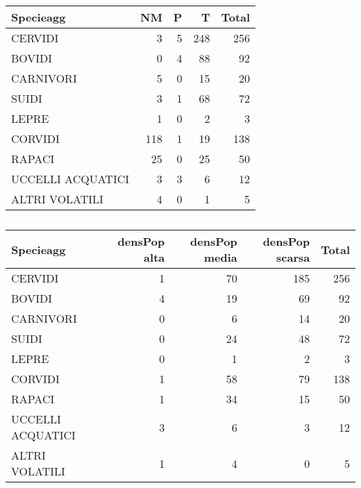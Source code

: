 \documentclass{article}
\begin{document}
\begin{table}[h]
\centering
\caption{}
\begin{tabular}{l|r|r|r|r}
\hline
Specieagg & NM & P & T & Total\\
\hline
CERVIDI & 3 & 5 & 248 & 256\\
\hline
BOVIDI & 0 & 4 & 88 & 92\\
\hline
CARNIVORI & 5 & 0 & 15 & 20\\
\hline
SUIDI & 3 & 1 & 68 & 72\\
\hline
LEPRE & 1 & 0 & 2 & 3\\
\hline
CORVIDI & 118 & 1 & 19 & 138\\
\hline
RAPACI & 25 & 0 & 25 & 50\\
\hline
UCCELLI ACQUATICI & 3 & 3 & 6 & 12\\
\hline
ALTRI VOLATILI & 4 & 0 & 1 & 5\\
\hline
\end{tabular}
\end{table}

\begin{table}[h]
\centering
\caption{}
\begin{tabular}{l|r|r|r|r}
\hline
Specieagg & densPop alta & densPop media & densPop scarsa & Total\\
\hline
CERVIDI & 1 & 70 & 185 & 256\\
\hline
BOVIDI & 4 & 19 & 69 & 92\\
\hline
CARNIVORI & 0 & 6 & 14 & 20\\
\hline
SUIDI & 0 & 24 & 48 & 72\\
\hline
LEPRE & 0 & 1 & 2 & 3\\
\hline
CORVIDI & 1 & 58 & 79 & 138\\
\hline
RAPACI & 1 & 34 & 15 & 50\\
\hline
UCCELLI ACQUATICI & 3 & 6 & 3 & 12\\
\hline
ALTRI VOLATILI & 1 & 4 & 0 & 5\\
\hline
\end{tabular}
\end{table}
\end{document}
